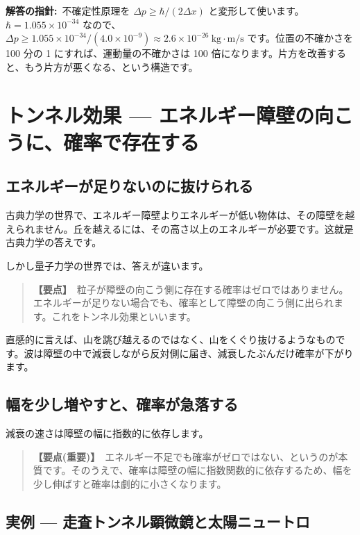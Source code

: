 \documentclass{article}
\begin{document}
\textbf{解答の指針:}\ 不確定性原理を \( \Delta p \ge \hbar / (2 \Delta x) \) と変形して使います。\( \hbar = 1.055 \times 10^{-34} \) なので、\(\Delta p \ge 1.055 \times 10^{-34} / (4.0 \times 10^{-9}) \approx 2.6 \times 10^{-26} \ \mathrm{kg \cdot m/s}\) です。位置の不確かさを 100 分の 1 にすれば、運動量の不確かさは 100 倍になります。片方を改善すると、もう片方が悪くなる、という構造です。

\section{トンネル効果 — エネルギー障壁の向こうに、確率で存在する}

\subsection{エネルギーが足りないのに抜けられる}

古典力学の世界で、エネルギー障壁よりエネルギーが低い物体は、その障壁を越えられません。丘を越えるには、その高さ以上のエネルギーが必要です。这就是古典力学の答えです。

しかし量子力学の世界では、答えが違います。

\begin{quote}
\textbf{【要点】}\ 粒子が障壁の向こう側に存在する確率はゼロではありません。エネルギーが足りない場合でも、確率として障壁の向こう側に出られます。これをトンネル効果といいます。
\end{quote}

直感的に言えば、山を跳び越えるのではなく、山をくぐり抜けるようなものです。波は障壁の中で減衰しながら反対側に届き、減衰したぶんだけ確率が下がります。

\subsection{幅を少し増やすと、確率が急落する}

減衰の速さは障壁の幅に指数的に依存します。

\begin{quote}
\textbf{【要点(重要)】}\ エネルギー不足でも確率がゼロではない、というのが本質です。そのうえで、確率は障壁の幅に指数関数的に依存するため、幅を少し伸ばすと確率は劇的に小さくなります。
\end{quote}

\subsection{実例 — 走査トンネル顕微鏡と太陽ニュートロ}
\end{document}
